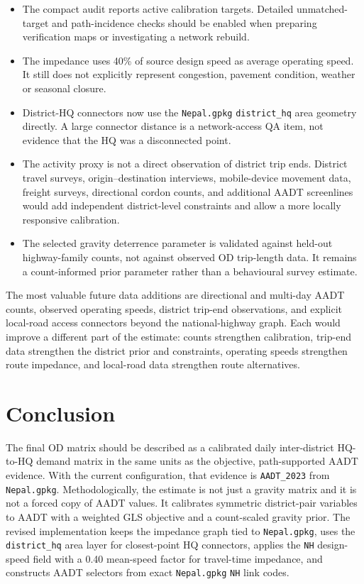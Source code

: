 \documentclass[11pt,a4paper]{article}
\begin{document}
\begin{itemize}
    between many distant or weakly related district pairs. These low cells are
    treated as modelled expectations, not as observed individual trips.
    \item The compact audit reports active calibration targets. Detailed
    unmatched-target and path-incidence checks should be enabled when preparing
    verification maps or investigating a network rebuild.
    \item The impedance uses 40\% of source design speed as average operating
    speed. It still does not explicitly represent congestion, pavement
    condition, weather or seasonal closure.
    \item District-HQ connectors now use the \texttt{Nepal.gpkg}
    \texttt{district\_hq} area geometry directly. A large connector distance is
    a network-access QA item, not evidence that the HQ was a disconnected point.
    \item The activity proxy is not a direct observation of district trip ends.
    District travel surveys, origin--destination interviews, mobile-device
    movement data, freight surveys, directional cordon counts, and additional
    AADT screenlines would add independent district-level constraints and allow
    a more locally responsive calibration.
    \item The selected gravity deterrence parameter is validated against held-out
    highway-family counts, not against observed OD trip-length data. It remains
    a count-informed prior parameter rather than a behavioural survey estimate.
\end{itemize}

The most valuable future data additions are directional and multi-day AADT
counts, observed operating speeds, district trip-end observations, and
explicit local-road access connectors beyond the national-highway graph. Each
would improve a different part of the estimate: counts strengthen calibration,
trip-end data strengthen the district prior and constraints, operating speeds
strengthen route impedance, and local-road data strengthen route alternatives.

\section{Conclusion}

The final OD matrix should be described as a calibrated daily inter-district
HQ-to-HQ demand matrix in the same units as the objective, path-supported AADT
evidence. With the current
configuration, that evidence is \texttt{AADT\_2023} from
\texttt{Nepal.gpkg}. Methodologically, the estimate is not just a gravity
matrix and it is not a forced copy of AADT values. It calibrates symmetric
district-pair variables to AADT with a weighted GLS objective and a
count-scaled gravity prior.
The revised implementation keeps the impedance graph tied to \texttt{Nepal.gpkg}, uses
the \texttt{district\_hq} area layer for closest-point HQ connectors, applies
the \texttt{NH} design-speed field with a 0.40 mean-speed factor for
travel-time impedance, and constructs AADT selectors from exact
\texttt{Nepal.gpkg} \texttt{NH} link codes.
\end{document}
